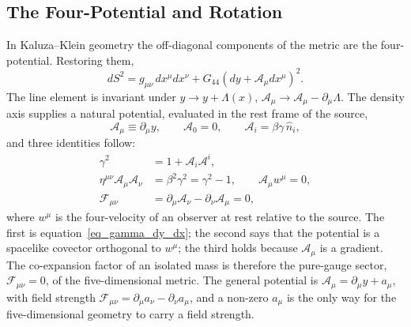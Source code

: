 \documentclass{iopjournal}
\begin{document}
\subsection{The Four-Potential and Rotation}\label{sec_four_potential}

In Kaluza--Klein geometry the off-diagonal components of the metric are the four-potential. Restoring them,
\begin{equation}\label{eq_kk_full}
    dS^2=g_{\mu\nu}\,dx^\mu dx^\nu+G_{44}\left(dy+\mathcal{A}_\mu dx^\mu\right)^2 .
\end{equation}
The line element is invariant under $y\to y+\Lambda(x)$, $\mathcal{A}_\mu\to\mathcal{A}_\mu-\partial_\mu\Lambda$. The density axis supplies a natural potential, evaluated in the rest frame of the source,
\begin{equation}\label{eq_potential_definition}
    \mathcal{A}_\mu\equiv\partial_\mu y,
    \qquad
    \mathcal{A}_0=0,
    \qquad
    \mathcal{A}_i=\beta\gamma\,\hat{n}_i ,
\end{equation}
and three identities follow:
\begin{align}
    \gamma^2 &= 1+\mathcal{A}_i\mathcal{A}^i,
    \label{eq_gamma_from_potential}\\
    \eta^{\mu\nu}\mathcal{A}_\mu\mathcal{A}_\nu &= \beta^2\gamma^2=\gamma^2-1,
    \qquad
    \mathcal{A}_\mu w^\mu=0,
    \label{eq_potential_norm}\\
    \mathcal{F}_{\mu\nu} &= \partial_\mu\mathcal{A}_\nu-\partial_\nu\mathcal{A}_\mu=0,
    \label{eq_potential_field_strength}
\end{align}
where $w^\mu$ is the four-velocity of an observer at rest relative to the source. The first is equation~\eqref{eq_gamma_dy_dx}; the second says that the potential is a spacelike covector orthogonal to $w^\mu$; the third holds because $\mathcal{A}_\mu$ is a gradient. The co-expansion factor of an isolated mass is therefore the pure-gauge sector, $\mathcal{F}_{\mu\nu}=0$, of the five-dimensional metric. The general potential is $\mathcal{A}_\mu=\partial_\mu y+a_\mu$, with field strength $\mathcal{F}_{\mu\nu}=\partial_\mu a_\nu-\partial_\nu a_\mu$, and a non-zero $a_\mu$ is the only way for the five-dimensional geometry to carry a field strength.
\end{document}
